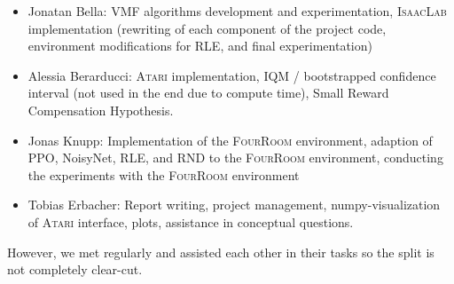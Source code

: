\documentclass[10pt]{article} %
\begin{document}
\begin{itemize}
  \item Jonatan Bella: VMF algorithms development and experimentation, \textsc{IsaacLab} implementation (rewriting of each component of the project code, environment modifications for RLE, and final experimentation)
  \item Alessia Berarducci: \textsc{Atari} implementation, IQM / bootstrapped confidence interval (not used in the end due to compute time), Small Reward Compensation Hypothesis.
  \item Jonas Knupp: Implementation of the \textsc{FourRoom} environment, adaption of PPO, NoisyNet, RLE, and RND to the \textsc{FourRoom} environment, conducting the experiments with the \textsc{FourRoom} environment
  \item Tobias Erbacher: Report writing, project management, numpy-visualization of \textsc{Atari} interface, plots, assistance in conceptual questions.
\end{itemize}

\noindent However, we met regularly and assisted each other in their tasks so the split is not completely clear-cut.






\end{document}
